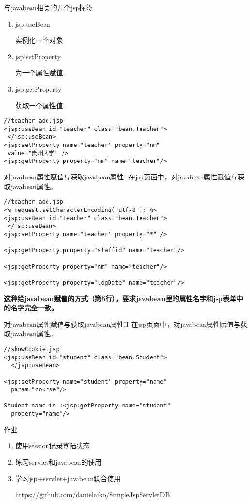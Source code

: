 \documentclass{beamer}
\begin{document}
\begin{frame}[fragile]{与javabean相关的几个jsp标签}
\begin{enumerate}
\item
jsp:useBean

实例化一个对象
\item
jsp:setProperty

为一个属性赋值
\item
jsp:getProperty

获取一个属性值
\end{enumerate}
\begin{lstlisting}
//teacher_add.jsp
<jsp:useBean id="teacher" class="bean.Teacher">
 </jsp:useBean>
<jsp:setProperty name="teacher" property="nm"
 value="贵州大学" />
<jsp:getProperty property="nm" name="teacher"/>

\end{lstlisting}

\end{frame}

\begin{frame}[fragile]{对javabean属性赋值与获取javabean属性I}
在jsp页面中，对javabean属性赋值与获取javabean属性。
\begin{lstlisting}
//teacher_add.jsp
<% request.setCharacterEncoding("utf-8"); %>
<jsp:useBean id="teacher" class="bean.Teacher">
 </jsp:useBean>
<jsp:setProperty name="teacher" property="*" />

<jsp:getProperty property="staffid" name="teacher"/>

<jsp:getProperty property="nm" name="teacher"/>

<jsp:getProperty property="logDate" name="teacher"/>

\end{lstlisting}
\textbf{这种给javabean赋值的方式（第5行），要求javabean里的属性名字和jsp表单中的名字完全一致。}
\end{frame}
\begin{frame}[fragile]{对javabean属性赋值与获取javabean属性II}
在jsp页面中，对javabean属性赋值与获取javabean属性。
\begin{lstlisting}
//showCookie.jsp
<jsp:useBean id="student" class="bean.Student">
  </jsp:useBean>
  
<jsp:setProperty name="student" property="name" 
  param="course"/>

Student name is :<jsp:getProperty name="student" 
  property="name"/>
\end{lstlisting}

\end{frame}
\begin{frame}{作业}
\begin{enumerate}
\item
使用session记录登陆状态
\item
练习servlet和javabean的使用
\item
学习jsp+servlet+javabean联合使用

\url{https://github.com/danielniko/SimpleJspServletDB}
\end{enumerate}
\end{frame}
\end{document}
